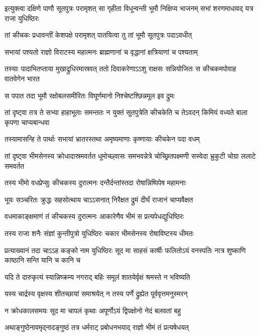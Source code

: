 \threelineshloka
{इत्युक्त्वा दक्षिणे पाणौ सूतपुत्रः परामृशत्}
{सा गृहीता विधून्वन्ती भूमौ निक्षिप्य भाजनम्}
{सभां शरणमाधावद् यत्र राजा युधिष्ठिरः}


\twolineshloka
{तां कीचकः प्रधावन्तीं केशपक्षे परामृशत्}
{पातयित्वा तु तां भूमौ सूतपुत्रः पदाऽवधीत्}


\twolineshloka
{सभायां पश्यतो राज्ञो विराटस्य महात्मनः}
{ब्राह्मणानां च वृद्धानां क्षत्रियाणां च पश्यताम्}


\onelineshloka
{तस्याः पादाभितप्ताया मुखाद्रुधिरमास्रवत्}
\twolineshloka
{ततो दिवाकरेणाऽऽशु राक्षसः सन्नियोजितः}
{स कीचकमपोवाह वातवेगेन भारत}


\twolineshloka
{स पपात तदा भूमौ रक्षोबलसमीरितः}
{विघूर्णमानो निश्चेष्टश्छिन्नमूल इव द्रुमः}


\threelineshloka
{तां दृष्ट्वा तत्र ते सभ्या हाहाभूताः समन्ततः}
{न युक्तं सूतपुत्रेति कीचकेति च तेऽवदन्}
{किमियं वध्यते बाला कृपणा चाप्यबान्धवा}


\twolineshloka
{तस्यामासन्हि ते पार्थाः सभायां भ्रातरस्तथा}
{अमृष्यमाणाः कृष्णायाः कीचकेन पदा वधम्}


\threelineshloka
{तां दृष्ट्वा भीमसेनस्य क्रोधादास्रमवर्तत}
{धूमोच्छ्वासः समभवन्नेत्रे चोच्छ्रितपक्ष्मणी}
{सस्वेदा भ्रुकुटी चोग्रा ललाटे समवर्तत}


\twolineshloka
{तस्य भीमो वधप्रेप्सुः कीचकस्य दुरात्मनः}
{दन्तैर्दन्तांस्तदा रोषान्निष्पिपेष महामनाः}


\twolineshloka
{भूयः सञ्चरितः क्रुद्धः सहसोत्थाय चाऽऽसनात्}
{निरैक्षत द्रुमं दीर्घं राजानं चाप्यवैक्षत}


\twolineshloka
{वधमाकाङ्क्षमाणं तं कीचकस्य दुरात्मनः}
{आकारेणैव भीमं स प्रत्यपेधद्युधिष्ठिरः}


\twolineshloka
{तस्य राजा शनैः संज्ञां कुन्तीपुत्रो युधिष्ठिरः}
{चकार भीमसेनस्य रोषाविष्टस्य धीमतः}


\onelineshloka
{प्रत्याख्यानं तदा चाऽऽह कङ्को नाम युधिष्ठिरः}
\twolineshloka
{सूद मा साहसं कार्षीः फलितोऽयं वनस्पतिः}
{नात्र शुष्काणि काष्ठानि सन्ति यानि च कानि च}


\twolineshloka
{यदि ते दारुकृत्यं स्यान्निष्क्रम्य नगराद् बहिः}
{समूलं शातयेर्वृक्षं श्रमस्ते न भविष्यति}


\twolineshloka
{यस्य चार्द्रस्य वृक्षस्य शीतच्छायां समाश्रयेत्}
{न तस्य पर्णे द्रुह्येत पूर्ववृत्तमनुस्मरन्}


\twolineshloka
{न क्रोधकालसमयः सूद मा चापलं कृथाः}
{अपूर्णोऽयं द्विपक्षोनो नेदं बलवतां बहु}


\twolineshloka
{अथाङ्गुष्ठेनावमृद्नादङ्गुष्ठं तत्र धर्मराट्}
{प्रबोधनभयाद् राज्ञो भीमं तं प्रत्यषेधयत्}


